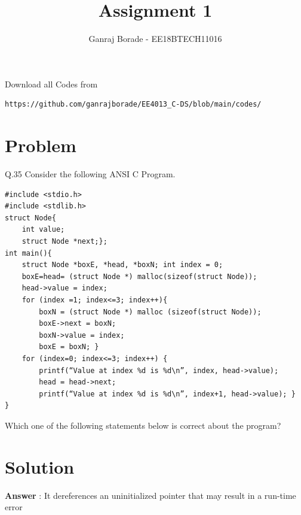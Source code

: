 \documentclass[journal,12pt,twocolumn]{IEEEtran}
\begin{document}
     \def\rightbox#1{\makebox[0in][r]{#1}}
     \def\centbox#1{\makebox[0in]{#1}}
     \def\topbox#1{\raisebox{-\baselineskip}[0in][0in]{#1}}
     \def\midbox#1{\raisebox{-0.5\baselineskip}[0in][0in]{#1}}
\vspace{3cm}
\title{Assignment 1}
\author{Ganraj Borade - EE18BTECH11016}
\maketitle
\newpage
\bigskip
\UseRawInputEncoding
\renewcommand{\thefigure}{\theenumi}
\renewcommand{\thetable}{\theenumi}
Download all Codes from 
%
\begin{lstlisting}
https://github.com/ganrajborade/EE4013_C-DS/blob/main/codes/
\end{lstlisting}

\section{Problem}
Q.35 Consider the following ANSI C Program.
\begin{lstlisting}
#include <stdio.h>
#include <stdlib.h>
struct Node{
	int value;
	struct Node *next;};
int main(){
    struct Node *boxE, *head, *boxN; int index = 0;
    boxE=head= (struct Node *) malloc(sizeof(struct Node));
    head->value = index;
    for (index =1; index<=3; index++){
	    boxN = (struct Node *) malloc (sizeof(struct Node));
	    boxE->next = boxN;
	    boxN->value = index;
	    boxE = boxN; }
    for (index=0; index<=3; index++) {
	    printf(“Value at index %d is %d\n”, index, head->value);
	    head = head->next;
	    printf(“Value at index %d is %d\n”, index+1, head->value); }
}
\end{lstlisting}
 Which one of the following statements below is correct about the program?

\section{Solution}
\textbf{Answer} : It dereferences an uninitialized pointer that may result in a run-time error
\newline
\end{document}
